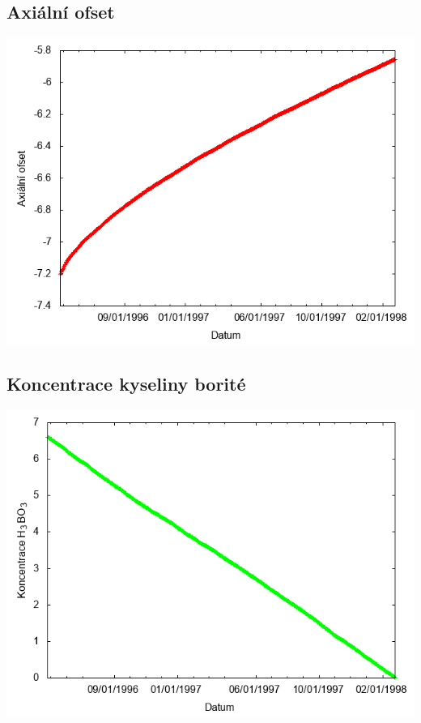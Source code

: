\documentclass[a4paper,twoside,11pt]{article}
\begin{document}
\subsection*{Axiální ofset}
\begin{center}
\includegraphics[width=.8\textwidth]{graphs/CandyMountain_06_ao.png}
\end{center}

\subsection*{Koncentrace kyseliny borité}
\begin{center}
\includegraphics[width=.8\textwidth]{graphs/CandyMountain_06_bc.png}
\end{center}
\end{document}
